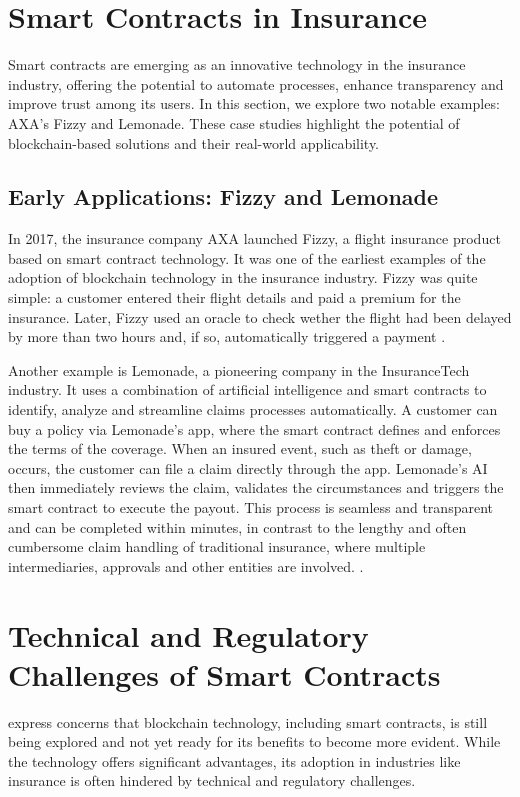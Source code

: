 \section{Smart Contracts in Insurance}\label{section:smart_contracts_insurance}
Smart contracts are emerging as an innovative technology in the insurance industry, offering the potential to automate processes, enhance transparency and improve trust among its users. In this section, we explore two notable examples: AXA's Fizzy and Lemonade. These case studies highlight the potential of blockchain-based solutions and their real-world applicability.

\subsection{Early Applications: Fizzy and Lemonade}
In 2017, the insurance company AXA launched Fizzy, a flight insurance product based on smart contract technology. It was one of the earliest examples of the adoption of blockchain technology in the insurance industry. Fizzy was quite simple: a customer entered their flight details and paid a premium for the insurance. Later, Fizzy used an oracle to check wether the flight had been delayed by more than two hours and, if so, automatically triggered a payment \autocite{hoffmann2021double}.

Another example is Lemonade, a pioneering company in the InsuranceTech industry. It uses a combination of artificial intelligence and smart contracts to identify, analyze and streamline claims processes automatically. A customer can buy a policy via Lemonade's app, where the smart contract defines and enforces the terms of the coverage. When an insured event, such as theft or damage, occurs, the customer can file a claim directly through the app. Lemonade's AI then immediately reviews the claim, validates the circumstances and triggers the smart contract to execute the payout. This process is seamless and transparent and can be completed within minutes, in contrast to the lengthy and often cumbersome claim handling of traditional insurance, where multiple intermediaries, approvals and other entities are involved. \autocites{la2023insurtech}{tardieu2020case}.

\section{Technical and Regulatory Challenges of Smart Contracts}\label{section:regulatory_technical_challenges}
\textcite{gatteschi2018blockchain} express concerns that blockchain technology, including smart contracts, is still being explored and not yet ready for its benefits to become more evident. While the technology offers significant advantages, its adoption in industries like insurance is often hindered by technical and regulatory challenges.


